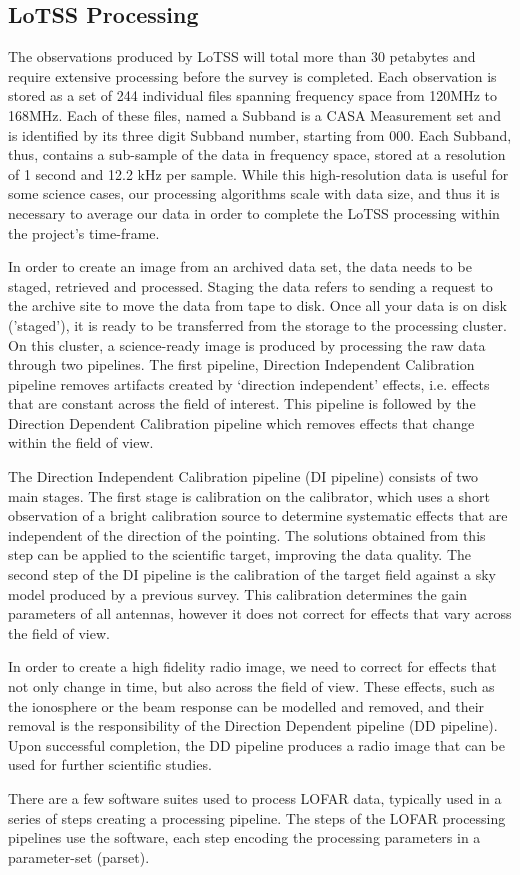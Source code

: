 \subsection{LoTSS Processing}

The observations produced by LoTSS will total more than 30 petabytes and require extensive processing before the survey is completed. Each observation is stored as a set of 244 individual files spanning frequency space from 120MHz to 168MHz. Each of these files, named a Subband is a CASA Measurement set and is identified by its three digit Subband number, starting from 000. Each Subband, thus, contains a sub-sample of the data in frequency space, stored at a resolution of 1 second and 12.2 kHz per sample. While this high-resolution data is useful for some science cases, our processing algorithms scale with data size, and thus it is necessary to average our data in order to complete the LoTSS processing within the project's time-frame. 

In order to create an image from an archived data set, the data needs to be staged, retrieved and processed. Staging the data refers to sending a request to the archive site to move the data from tape to disk. Once all your data is on disk ('staged'), it is ready to be transferred from the storage to the processing cluster. On this cluster, a science-ready image is produced by processing the raw data through two pipelines. The first pipeline, Direction Independent Calibration pipeline removes artifacts created by `direction independent' effects, i.e. effects that are constant across the field of interest. This pipeline is followed by the Direction Dependent Calibration pipeline which removes effects that change within the field of view.
 
The Direction Independent Calibration pipeline (DI pipeline) consists of two main stages. The first stage is calibration on the calibrator, which uses a short observation of a bright calibration source to determine systematic effects that are independent of the direction of the pointing. The solutions obtained from this step can be applied to the scientific target, improving the data quality. The second step of the DI pipeline is the calibration of the target field against a sky model produced by a previous survey. This calibration determines the gain parameters of all antennas, however it does not correct for effects that vary across the field of view. 
 
In order to create a high fidelity radio image, we need to correct for effects that not only change in time, but also across the field of view. These effects, such as the ionosphere or the beam response can be modelled and removed, and their removal is the responsibility of the Direction Dependent pipeline (DD pipeline). Upon successful completion, the DD pipeline produces a radio image that can be used for further scientific studies.

There are a few software suites used to process LOFAR data, typically used in a series of steps creating a processing pipeline. The steps of the LOFAR processing pipelines use the software, each step encoding the processing parameters in a parameter-set (parset). 






